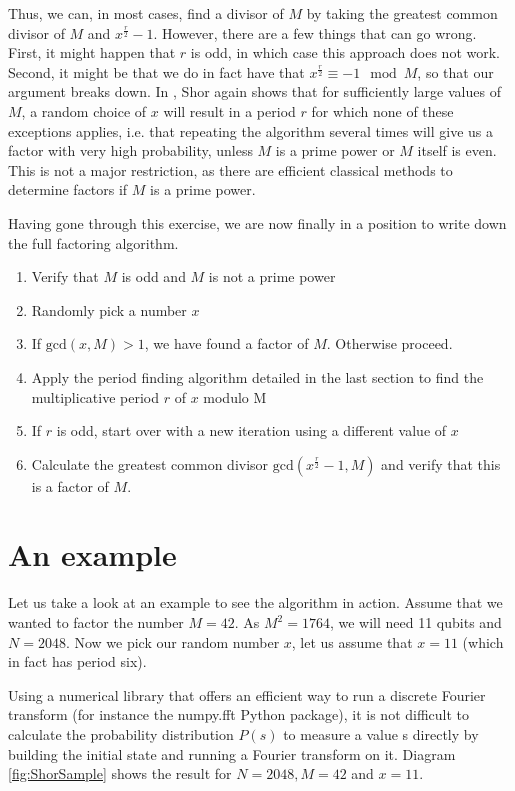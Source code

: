 \documentclass[a4paper, draft]{article}
\theoremstyle{own}
\theoremstyle{remark}
\begin{document}
Thus, we can, in most cases, find a divisor of $M$ by taking the greatest common divisor of $M$ and $x^{\frac{r}{2}} - 1$. However, there are a few things that can go wrong. First, it might happen that $r$ is odd, in which case this approach does not work. Second, it might be that we do in fact have that $x^{\frac{r}{2}} \equiv - 1 \mod M$, so that our argument breaks down. In \cite{Shor96}, Shor again shows that for sufficiently large values of $M$, a random choice of $x$ will result in a period $r$ for which none of these exceptions applies, i.e. that repeating the algorithm several times will give us a factor with very high probability, unless $M$ is a prime power or $M$ itself is even. This is not a major restriction, as there are efficient classical methods to determine factors if $M$ is a prime power.

Having gone through this exercise, we are now finally in a position to write down the full factoring algorithm.

\begin{enumerate}
	\item Verify that $M$ is odd and $M$ is not a prime power
	\item Randomly pick a number $x$ 
	\item If $\text{gcd}(x, M) > 1$, we have found a factor of $M$. Otherwise proceed.
	\item Apply the period finding algorithm detailed in the last section to find the multiplicative period $r$ of $x$ modulo M
	\item If $r$ is odd, start over with a new iteration using a different value of $x$
	\item Calculate the greatest common divisor $\text{gcd}(x^{\frac{r}{2}} - 1, M)$ and verify that this is a factor of $M$.
\end{enumerate}
	

\section{An example}

Let us take a look at an example to see the algorithm in action. Assume that we wanted to factor the number $M = 42$. As $M^2 = 1764$, we will need 11 qubits and $N = 2048$. Now we pick our random number $x$, let us assume that $x = 11$ (which in fact has period six).

Using a numerical library that offers an efficient way to run a discrete Fourier transform (for instance the numpy.fft Python package), it is not difficult to calculate the probability distribution $P(s)$ to measure a value s directly by building the initial state and running a Fourier transform on it. Diagram \ref{fig:ShorSample} shows the result for $N = 2048, M = 42$ and $x = 11$. 
\end{document}
